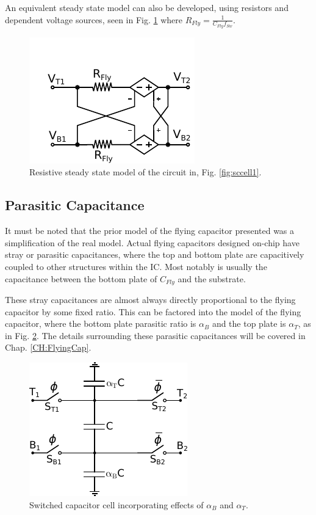 	An equivalent steady state model can also be developed, using resistors and dependent voltage sources, seen in Fig. \ref{fig:ResModelBasic} where $R_{Fly} = \frac{1}{C_{Fly}f_{Sw}}$.
	\begin{figure}
		\centering
		\includegraphics[width=0.4\linewidth]{4Terminal/Figures/CellRes_SSL_Basic.pdf}
		\caption{Resistive steady state model of the circuit in, Fig. \ref{fig:sccell1}.}
		\label{fig:ResModelBasic}
	\end{figure}
	
	\subsection{Parasitic Capacitance}
	It must be noted that the prior model of the flying capacitor presented was a simplification of the real model. Actual flying capacitors designed on-chip have stray or parasitic capacitances, where the top and bottom plate are capacitively coupled to other structures within the IC. Most notably is usually the capacitance between the bottom plate of $C_{Fly}$ and the substrate.
	
	These stray capacitances are almost always directly proportional to the flying capacitor by some fixed ratio. This can be factored into the model of the flying capacitor, where the bottom plate parasitic ratio is $\alpha_B$ and the top plate is $\alpha_T$, as in Fig. \ref{fig:sccell}. The details surrounding these parasitic capacitances will be covered in Chap. \ref{CH:FlyingCap}.
	
	\begin{figure}
		\centering
		\includegraphics{4Terminal/Figures/SCCell.pdf}
		\caption{Switched capacitor cell incorporating effects of $\alpha_B$ and $\alpha_T$.}
		\label{fig:sccell}
	\end{figure}
	

